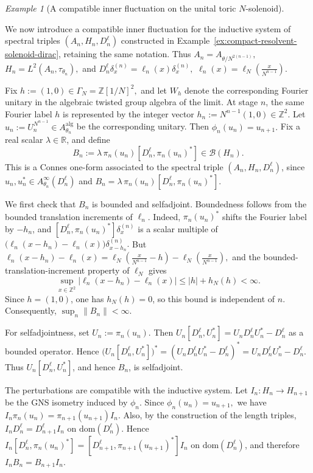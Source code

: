 \documentclass[11pt]{amsart}
\theoremstyle{definition}
\theoremstyle{remark}
\newtheorem{example}[theorem]{Example}
\newcommand{\Z}{\mathbb{Z}}
\newcommand{\R}{\mathbb{R}}
\newcommand{\dom}{\mathrm{dom}}
\begin{document}
\begin{example}[A compatible inner fluctuation on the unital toric \(N\)-solenoid]
\label{ex:solenoid-inner-fluctuation}

We now introduce a compatible inner fluctuation for the inductive system of spectral triples $(A_n,H_n,D_n^\ell)$ constructed in Example~\ref{ex:compact-resolvent-solenoid-dirac}, retaining the same notation. Thus $A_n=A_{\theta/N^{2(n-1)}},$
$H_n=L^2(A_n,\tau_{\theta_n}),$
and $D_n^\ell\delta_x^{(n)}=\ell_n(x)\delta_x^{(n)},$ $\ell_n(x)=\ell_N\left(\frac{x}{N^{n-1}}\right).$

Fix $h:=(1,0)\in \Gamma_N=\Z[1/N]^2,$
and let $W_h$ denote the corresponding Fourier unitary in the algebraic
twisted group algebra of the limit. At stage $n$, the same Fourier label $h$
is represented by the integer vector $h_n:=N^{n-1}(1,0)\in\Z^2.$
Let $u_n:=U_n^{N^{n-1}}\in A_{\theta_n}^{\mathrm{alg}}$
be the corresponding unitary. Then $\phi_n(u_n)=u_{n+1}.$ Fix a real scalar $\lambda\in\R$, and define
\[
B_n:=\lambda\,\pi_n(u_n)[D_n^\ell,\pi_n(u_n)^*]\in \mathcal B(H_n).
\]
This is a Connes one-form associated to the spectral triple
$(A_n,H_n,D_n^\ell)$, since $u_n,u_n^*\in A_{\theta_n}^{\infty}(D_n^\ell)$
and $B_n=\lambda\,\pi_n(u_n)[D_n^\ell,\pi_n(u_n)^*].$

We first check that $B_n$ is bounded and selfadjoint. Boundedness follows from
the bounded translation increments of $\ell_n$. Indeed, $\pi_n(u_n)^*$
shifts the Fourier label by $-h_n$, and $[D_n^\ell,\pi_n(u_n)^*]\delta_x^{(n)}$
is a scalar multiple of $\bigl(\ell_n(x-h_n)-\ell_n(x)\bigr)\delta_{x-h_n}^{(n)}.$
But $\ell_n(x-h_n)-\ell_n(x)=\ell_N\left(\frac{x}{N^{n-1}}-h\right)-\ell_N\left(\frac{x}{N^{n-1}}\right),$
and the bounded-translation-increment property of $\ell_N$ gives
\[
\sup_{x\in\Z^2}
\left|
\ell_n(x-h_n)-\ell_n(x)
\right|
\leq |h|+h_N(h)<\infty.
\]
Since $h=(1,0)$, one has $h_N(h)=0$, so this bound is independent of $n$.
Consequently, $\sup_n\|B_n\|<\infty.$

For selfadjointness, set $U_n:=\pi_n(u_n)$. Then $U_n[D_n^\ell,U_n^*]=U_nD_n^\ell U_n^*-D_n^\ell$
as a bounded operator. Hence $\bigl(U_n[D_n^\ell,U_n^*]\bigr)^*=(U_nD_n^\ell U_n^*-D_n^\ell)^*=U_nD_n^\ell U_n^*-D_n^\ell.$
Thus $U_n[D_n^\ell,U_n^*]$, and hence $B_n$, is selfadjoint.

The perturbations are compatible with the inductive system. Let $I_n:H_n\to H_{n+1}$ 
be the GNS isometry induced by $\phi_n$. Since $\phi_n(u_n)=u_{n+1},$ we have $I_n\pi_n(u_n)=\pi_{n+1}(u_{n+1})I_n.$
Also, by the construction of the length triples, $I_nD_n^\ell=D_{n+1}^\ell I_n$ on $\dom(D_n^\ell)$.
Hence $
I_n[D_n^\ell,\pi_n(u_n)^*]=[D_{n+1}^\ell,\pi_{n+1}(u_{n+1})^*]I_n$ on $\dom(D_n^\ell)$,
and therefore $I_nB_n=B_{n+1}I_n.$


\end{example}
\end{document}
